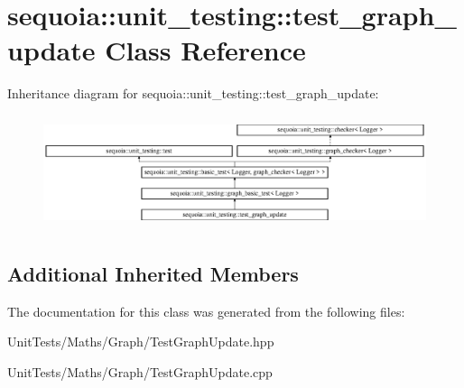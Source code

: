\hypertarget{classsequoia_1_1unit__testing_1_1test__graph__update}{}\section{sequoia\+::unit\+\_\+testing\+::test\+\_\+graph\+\_\+update Class Reference}
\label{classsequoia_1_1unit__testing_1_1test__graph__update}
Inheritance diagram for sequoia\+::unit\+\_\+testing\+::test\+\_\+graph\+\_\+update\+:\begin{figure}[H]
\begin{center}
\leavevmode
\includegraphics[height=3.357314cm]{classsequoia_1_1unit__testing_1_1test__graph__update}
\end{center}
\end{figure}
\subsection*{Additional Inherited Members}


The documentation for this class was generated from the following files\+:\begin{DoxyCompactItemize}
\item 
Unit\+Tests/\+Maths/\+Graph/Test\+Graph\+Update.\+hpp\item 
Unit\+Tests/\+Maths/\+Graph/Test\+Graph\+Update.\+cpp\end{DoxyCompactItemize}
